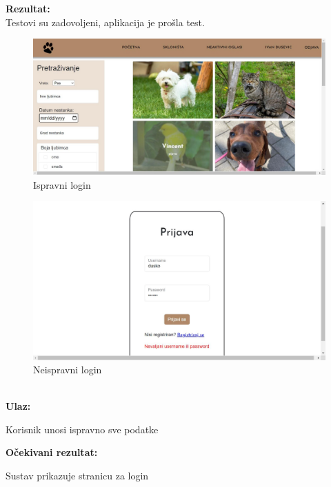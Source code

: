			\noindent \textbf{Rezultat:}\\
				Testovi su zadovoljeni, aplikacija je prošla test.\\
				\begin{figure}[H]
					\includegraphics[width=\textwidth]{uspjesni_login.JPEG}
					\centering
					\caption{Ispravni login}
					\label{fig:uspjesnilogin}
				\end{figure}
				\begin{figure}[H]
					\includegraphics[width=\textwidth]{krivi_login.JPEG}
					\centering
					\caption{Neispravni login}
					\label{fig:neuspjesnilogin}
				\end{figure}
			
			\noindent {}\\
			\textbf{Ulaz: }	
			\begin{packed_enum}
				\item Korisnik unosi ispravno sve podatke
				
			\end{packed_enum}
			
			\noindent \textbf{Očekivani rezultat:}
			
			\begin{packed_enum}
				\item Sustav prikazuje stranicu za login
				
			\end{packed_enum}
			

